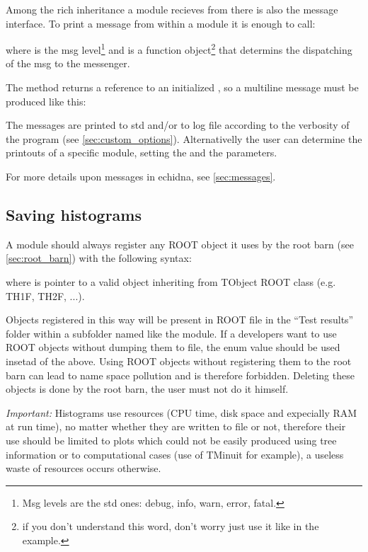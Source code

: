 Among the rich inheritance a module recieves from  there is also the message interface.
To print a message from within a module it is enough to call:
     

where  is the msg level\footnote{Msg levels are the std ones: debug, info, warn, error, fatal.} and  is a function object\footnote{if you don't understand this word, don't worry just use it like in the example.} that determins the dispatching of the msg to the messenger.

The  method returns a reference to an initialized , so a multiline message must be produced like this:

\noindent{}

The messages are printed to std and/or to log file according to the verbosity of the program (see \ref{sec:custom_options}).
Alternativelly the user can determine the printouts of a specific module, setting the  and the  parameters.

For more details upon messages in echidna, see \ref{sec:messages}.

\subsection{Saving histograms}

A module should always register any ROOT object it uses by the root barn (see \ref{sec:root_barn}) with the following syntax:


where  is pointer to a valid object inheriting from TObject ROOT class (e.g. TH1F, TH2F, ...).

Objects registered in this way will be present in ROOT file in the ``Test results'' folder within a subfolder named like the module.
If a developers want to use ROOT objects without dumping them to file, the enum value  should be used insetad of the above.
Using ROOT objects without registering them to the root barn can lead to name space pollution and is therefore forbidden.
Deleting these objects is done by the root barn, the user must not do it himself.

\emph{Important:} Histograms use resources (CPU time, disk space and expecially RAM at run time), no matter whether they are written to file or not, therefore their use should be limited to plots which could not be easily produced using tree information or to computational cases (use of TMinuit for example), a useless waste of resources occurs otherwise.

